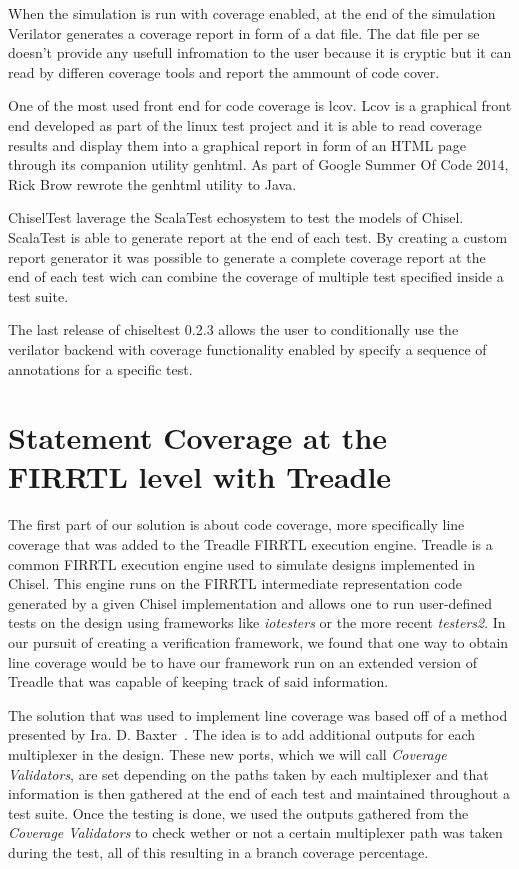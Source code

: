 \documentclass[conference]{IEEEtran}
\begin{document}
When the simulation is run with coverage enabled, at the end of the simulation Verilator generates a coverage report in form of a dat file. The dat file per se doesn't provide any usefull infromation to the user because it is cryptic but it can read by differen coverage tools and report the ammount of code cover. 

One of the most used front end for code coverage is lcov. Lcov is a graphical front end developed as part of the linux test project and it is able to read coverage results and display them into a graphical report in form of an HTML page through its companion utility genhtml. As part of Google Summer Of Code 2014, Rick Brow rewrote the genhtml utility to Java.

ChiselTest laverage the ScalaTest echosystem to test the models of Chisel. ScalaTest is able to generate report at the end of each test. By creating a custom report generator it was possible to generate a complete coverage report at the end of each test wich can combine the coverage of multiple test specified inside a test suite.

The last release of chiseltest 0.2.3 allows the user to conditionally use the verilator backend with coverage functionality enabled by specify a sequence of annotations
for a specific test.

\section{Statement Coverage at the FIRRTL level with Treadle}  
The first part of our solution is about code coverage, more specifically line coverage that was added to the Treadle FIRRTL execution engine. Treadle is a common FIRRTL execution engine used to simulate designs implemented in Chisel. This engine runs on the FIRRTL intermediate representation code generated by a given Chisel implementation and allows one to run user-defined tests on the design using frameworks like \textit{iotesters} or the more recent \textit{testers2}. In our pursuit of creating a verification framework, we found that one way to obtain line coverage would be to have our framework run on an extended version of Treadle that was capable of keeping track of said information.

The solution that was used to implement line coverage was based off of a method presented by Ira. D. Baxter~\cite{branch-cov-made-easy:2002}. The idea is to add additional outputs for each multiplexer in the design. These new ports, which we will call \textit{Coverage Validators}, are set depending on the paths taken by each multiplexer and that information is then gathered at the end of each test and maintained throughout a test suite. Once the testing is done, we used the outputs gathered from the \textit{Coverage Validators} to check wether or not a certain multiplexer path was taken during the test, all of this resulting in a branch coverage percentage. 
\end{document}
